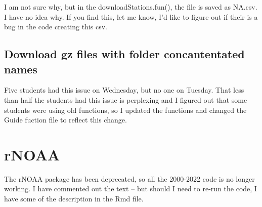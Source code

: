 \documentclass{article}\usepackage[]{graphicx}\usepackage[dvipsnames]{xcolor}
\begin{document}
I am not sure why, but in the downloadStations.fun(), the file is saved as NA.csv. I have no idea why. If you find this, let me know, I'd like to figure out if their is a bug in the code creating this csv.

\subsection{Download gz files with folder concantentated names}

Five students had this issue on Wednesday, but no one on Tuesday. That less than half the students had this issue is perplexing and I figured out that some students were using old functions, so I updated the functions and changed the Guide fuction file to reflect this change. 




\section{rNOAA}

The rNOAA package has been deprecated, so all the 2000-2022 code is no longer working. I have commented out the text -- but should I need to re-run the code, I have some of the description in the Rmd file. 




\end{document}
